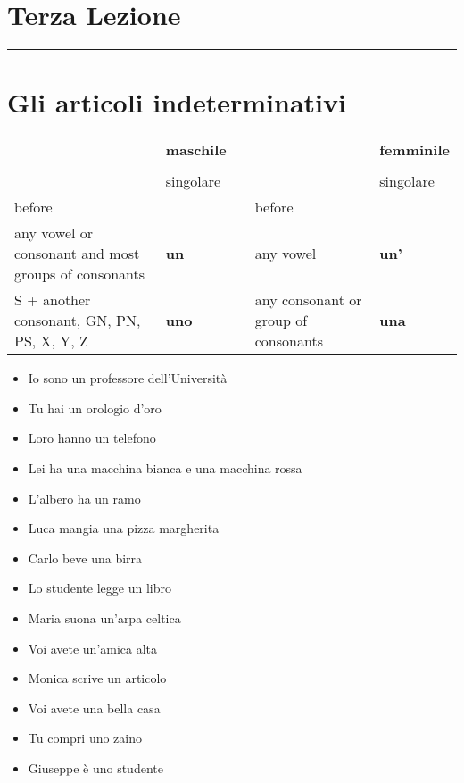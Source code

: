 \documentclass[letter,11pt]{article}
\begin{document}
\section*{\Large{Terza Lezione}}
\noindent\rule{16cm}{1pt}

\section*{Gli articoli indeterminativi}
\vskip 0.2in

\begin{tabular}{ |p{4cm}| p{3cm}| p{0.2cm}| p{4cm}| p{3cm}| }
     &   {\bf maschile} & & & {\bf femminile} \\
     &  & & &\\
    \hline
     &  singolare & & & singolare  \\
    \hline
    \hline
    before &   & & before & \\ \hline
    any vowel or consonant and most groups of consonants & {\bf un} & & any vowel &  {\bf un'}  \\ \hline
    S + another consonant, GN, PN, PS, X, Y, Z & {\bf uno} & & any consonant or group of consonants &  {\bf una}  \\ \hline
    \hline

\end{tabular}

\vskip 0.5in
\begin{multicols}{2}
\begin{itemize}
    \item Io sono un professore dell'Università
    \item Tu hai un orologio d'oro
    \item Loro hanno un telefono
    \item Lei ha una macchina bianca e una macchina rossa
    \item L'albero ha un ramo
    \item Luca mangia una pizza margherita
    \item Carlo beve una birra
    \item Lo studente legge un libro
    \item Maria suona un'arpa celtica
    \item Voi avete un'amica alta
    \item Monica scrive un articolo
    \item Voi avete una bella casa
    \item Tu compri uno zaino
    \item Giuseppe è uno studente


\end{itemize}
\end{multicols}
\end{document}
